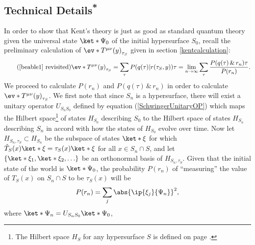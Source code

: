 \documentclass[12pt]{report}
\begin{document}
\subsection{Technical Details\textsuperscript{*}}
In order to show that Kent's theory is just as good as standard quantum theory given the universal state $\ket*{\Psi_0}$ of the initial hypersurface $S_0$,  recall the preliminary calculation of $\ev*{T^{\mu\nu}(y)}_{\tau_S}$ given in section \ref{kentcalculation}:
\begin{equation}\tag{\ref{beable1} revisited}
	\ev*{T^{\mu\nu}(y)}_{\tau_S}=\sum_\tau P(q(\tau) | r(\tau_S,y))\tau=\lim_{n\rightarrow\infty}\sum_\tau\frac{P(q(\tau) \, \& \, r_n)\tau}{P(r_n)}.
\end{equation}
We proceed to calculate $P(r_n)$ and $P(q(\tau)\, \& \,r_n)$ in order to calculate  $\ev*{T^{\mu\nu}(y)}_{\tau_S}$. We first note that since $S_n$ is a hypersurface,   there will exist a unitary operator $U_{S_nS_0}$ defined by equation (\ref{SchwingerUnitaryOP}) which maps the Hilbert space\footnote{The Hilbert space $H_S$ for any hypersurface $S$ is defined on page \pageref{HSdef}.} of states $H_{S_0}$ describing $S_0$ to the Hilbert space of states $H_{S_n}$\label{HSidef} describing $S_n$ in accord with how the states of $H_{S_0}$  evolve over time. Now let $H_{S_n,\tau_S}\label{HStau}\subset H_{S_n}$ %
%
 be the subspace of states $\ket*{\xi}$ for which  $\hat{T}_S(x)\ket*{\xi}=\tau_S(x)\ket*{\xi}$  for all $x\in S_n\cap S$, and  let $\{\ket*{\xi_1},\ket*{\xi_2},\ldots\}$  %
 be an orthonormal basis of $H_{S_n,\tau_S}$. Given that the initial state of the world is $\ket*{\Psi_0}$, the probability $P(r_n)$ of ``measuring'' the value of $T_S(x)$ on $S_n\cap S$ to be $\tau_S(x)$ will be 
\begin{equation}\label{Pri}
P(r_n)=\sum_j \abs{ \ip{\xi_j}{\Psi_n}}^2,
\end{equation}
where $\ket*{\Psi_n}=U_{S_nS_0}\ket*{\Psi_0}$, %
%
\end{document}
